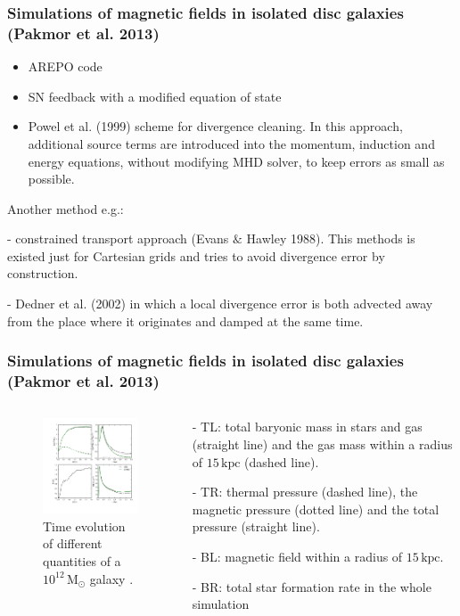 \documentclass[10pt,aspectratio=169]{beamer}
\begin{document}
\begin{frame}
	\frametitle{Simulations of magnetic fields in isolated disc galaxies (Pakmor et al. 2013)}
	\begin{itemize}
		\item AREPO code
		\item SN feedback with a modified equation of state
		\item Powel et al. (1999) scheme for divergence cleaning. In this approach, additional source terms are introduced into the momentum, induction and energy equations, without modifying MHD solver, to keep errors as small as possible.
	\end{itemize}
Another method e.g.: 

- constrained transport approach (Evans $\&$ Hawley 1988). This methods is existed just for Cartesian grids and tries to avoid divergence error by construction.

- Dedner et al. (2002) in which a local divergence error is both advected away from the place where it originates and damped at the same time.
\end{frame}
\begin{frame}
	\frametitle{Simulations of magnetic fields in isolated disc galaxies (Pakmor et al. 2013)}
	\begin{columns}
		\begin{column}{0.55\textwidth}
			\begin{figure}
				\includegraphics[width=7cm,trim=40 50 5 30,clip]{./images/timedepCmp.pdf}
				\caption{Time evolution of different quantities of a
					$10^{12}\,\mathrm{M_\odot}$ galaxy .}
			\end{figure}
		\end{column}
		\begin{column}{0.48\textwidth}
			
			- TL: total	baryonic mass in stars and gas (straight line) and the gas mass within a radius of $15\,\mathrm{kpc}$ (dashed line). 
			
			- TR: thermal pressure (dashed line), the magnetic pressure (dotted line) and the total pressure (straight line).
			
			- BL: magnetic field within a radius of $15\,\mathrm{kpc}$. 
			
			- BR: total star formation rate in the whole simulation
		\end{column}
	\end{columns}
\end{frame}
\end{document}
